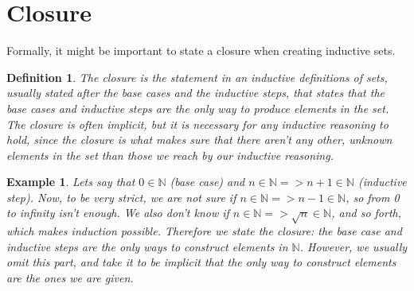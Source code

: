 \documentclass{article}
\newtheorem{definition}[theorem]{Definition}
\newtheorem{example}[theorem]{Example}
\begin{document}
\section{Closure}

Formally, it might be important to state a closure when creating inductive sets.

\begin{definition}
    The \textit{closure} is the statement in an inductive definitions of sets, usually stated after the base cases and the inductive steps, that states that the base cases and inductive steps are \textit{the only} way to produce elements in the set. The closure is often implicit, but it is necessary for any inductive reasoning to hold, since the closure is what makes sure that there aren't any other, unknown elements in the set than those we reach by our inductive reasoning.
\end{definition}

\begin{example}
    Lets say that $0 \in \mathbb{N}$ (base case) and $n \in \mathbb{N} => n+1 \in \mathbb{N}$ (inductive step). Now, to be very strict, we are not sure if $n \in \mathbb{N} => n-1 \in \mathbb{N}$, so from 0 to infinity isn't enough. We also don't know if $n \in \mathbb{N} => \sqrt{n} \in \mathbb{N}$, and so forth, which makes induction possible. Therefore we state the closure: the base case and inductive steps are \textit{the only} ways to construct elements in $\mathbb{N}$. However, we usually omit this part, and take it to be implicit that the only way to construct elements are the ones we are given.
\end{example}

 


\end{document}
